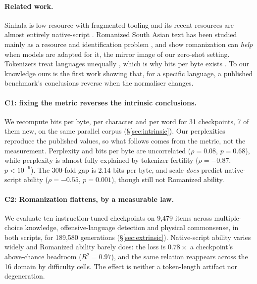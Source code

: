 \documentclass[11pt]{article}
\begin{document}
\paragraph{Related work.}
Sinhala is low-resource with fragmented tooling \citep{desilva-2019-survey,
ranathunga-de-silva-2022-languages, joshi-etal-2020-state} and its recent resources are
almost entirely native-script \citep{pramodya-etal-2025-sinhalammlu,
ranasinghe-etal-2025-sold, dhananjaya-etal-2022-bertifying, chang-etal-2025-globalpiqa}.
Romanized South Asian text has been studied mainly as a resource and identification
problem \citep{roark-etal-2020-dakshina, benton-etal-2025-improving}, and
\citet{j-etal-2024-romansetu} show romanization can \emph{help} when models are adapted
for it, the mirror image of our zero-shot setting. Tokenizers treat languages unequally
\citep{petrov-etal-2023-tokenizers, ahia-etal-2023-languages}, which is why bits per byte
exists \citep{gao-etal-2020-pile, magnusson-etal-2024-paloma}. To our knowledge ours is
the first work showing that, for a specific language, a published benchmark's conclusions
reverse when the normaliser changes.

\paragraph{C1: fixing the metric reverses the intrinsic conclusions.}
We recompute bits per byte, per character and per word for 31 checkpoints, 7 of them new,
on the same parallel corpus (\S\ref{sec:intrinsic}). Our perplexities reproduce the
published values, so what follows comes from the metric, not the measurement. Perplexity
and bits per byte are uncorrelated ($\rho = 0.08$, $p = 0.68$), while perplexity is almost
fully explained by tokenizer fertility ($\rho = -0.87$, $p < 10^{-9}$). The 300-fold gap is
2.14 bits per byte, and scale \emph{does} predict native-script ability
($\rho = -0.55$, $p = 0.001$), though still not Romanized ability.

\paragraph{C2: Romanization flattens, by a measurable law.}
We evaluate ten instruction-tuned checkpoints on 9{,}479 items across multiple-choice
knowledge, offensive-language detection and physical commonsense, in both scripts, for
189{,}580 generations (\S\ref{sec:extrinsic}). Native-script ability varies widely and
Romanized ability barely does: the loss is $0.78 \times$ a checkpoint's above-chance
headroom ($R^2 = 0.97$), and the same relation reappears across the 16 domain by
difficulty cells. The effect is neither a token-length artifact nor degeneration.
\end{document}
